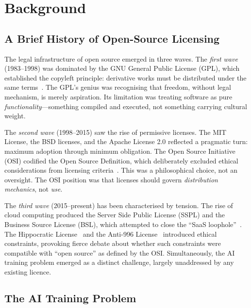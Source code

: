\documentclass[11pt,twocolumn]{article}
\begin{document}
\section{Background}
\label{sec:background}

\subsection{A Brief History of Open-Source Licensing}

The legal infrastructure of open source emerged in three waves. The
\emph{first wave} (1983--1998) was dominated by the GNU General Public
License (GPL), which established the copyleft principle: derivative works
must be distributed under the same terms~\cite{stallman2002free}. The
GPL's genius was recognising that freedom, without legal mechanism, is
merely aspiration. Its limitation was treating software as pure
\emph{functionality}---something compiled and executed, not something
carrying cultural weight.

The \emph{second wave} (1998--2015) saw the rise of permissive licenses.
The MIT License, the BSD licenses, and the Apache License 2.0 reflected
a pragmatic turn: maximum adoption through minimum obligation. The Open
Source Initiative (OSI) codified the Open Source Definition, which
deliberately excluded ethical considerations from licensing
criteria~\cite{perens1999osi}. This was a philosophical choice, not an
oversight. The OSI position was that licenses should govern
\emph{distribution mechanics}, not \emph{use}.

The \emph{third wave} (2015--present) has been characterised by tension.
The rise of cloud computing produced the Server Side Public License
(SSPL) and the Business Source License (BSL), which attempted to close
the ``SaaS loophole''~\cite{mongodb2018sspl}. The Hippocratic
License~\cite{ehmke2019hippocratic} and the Anti-996
License~\cite{anti996} introduced ethical constraints, provoking fierce
debate about whether such constraints were compatible with ``open source''
as defined by the OSI. Simultaneously, the AI training problem emerged
as a distinct challenge, largely unaddressed by any existing licence.

\subsection{The AI Training Problem}
\end{document}
